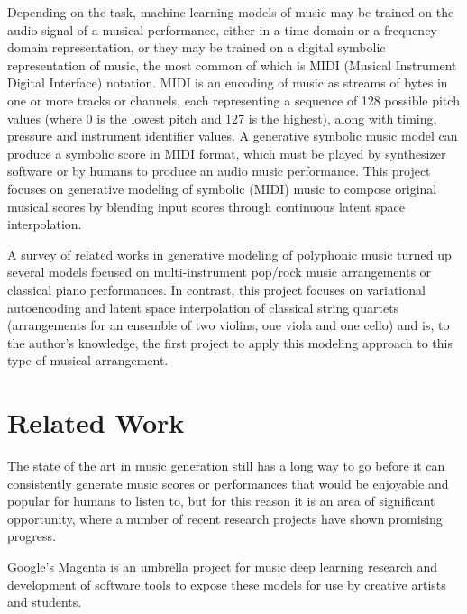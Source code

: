 \documentclass[sigconf,authorversion]{acmart}
\begin{document}
Depending on the task, machine learning models of music may be trained
on the audio signal of a musical performance, either in a time domain
or a frequency domain representation, or they may be trained on a
digital symbolic representation of music, the most common of which is
MIDI (Musical Instrument Digital Interface) notation. MIDI is an
encoding of music as streams of bytes in one or more tracks or
channels, each representing a sequence of 128 possible pitch values
(where 0 is the lowest pitch and 127 is the highest), along with
timing, pressure and instrument identifier values. A generative
symbolic music model can produce a symbolic score in MIDI format,
which must be played by synthesizer software or by humans to produce
an audio music performance. This project focuses on generative
modeling of symbolic (MIDI) music to compose original musical scores
by blending input scores through continuous latent space interpolation.

A survey of related works in generative modeling of polyphonic music
turned up several models focused on multi-instrument pop/rock music
arrangements or classical piano performances. In contrast, this
project focuses on variational autoencoding and latent space
interpolation of classical string quartets (arrangements for an
ensemble of two violins, one viola and one cello) and is, to the
author's knowledge, the first project to apply this modeling approach
to this type of musical arrangement.

\section{Related Work}

The state of the art in music generation still has a long way to go
before it can consistently generate music scores or performances that
would be enjoyable and popular for humans to listen to, but for this
reason it is an area of significant opportunity, where a number of
recent research projects have shown promising progress.

Google's \href{https://magenta.tensorflow.org/}{Magenta} is an
umbrella project for music deep learning research and development of
software tools to expose these models for use by creative artists and
students.
\end{document}
